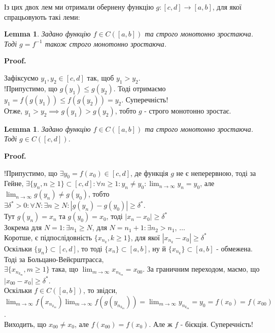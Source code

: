 \documentclass[a4paper, 14pt]{article}
\makeatletter
\def\qed{$\blacksquare$}
\theoremstyle{theoremdd}
\theoremstyle{theoremdd}
\theoremstyle{theoremdd}
\theoremstyle{theoremdd}
\theoremstyle{theoremdd}
\theoremstyle{theoremdd}
\theoremstyle{theoremdd}
\newtheorem{lemma}[theorem]{Lemma}
\theoremstyle{theoremdd}
\renewenvironment{proof}[1][Proof.\\]{\par
\pushQED{\hfill \qed}%
\normalfont \topsep6\p@\@plus6\p@\relax
\trivlist
\item\relax
{\bfseries
#1\@addpunct{.}}\hspace\labelsep\ignorespaces
}{%
\popQED\endtrivlist\@endpefalse
}
\makeatother
\begin{document}
Із цих двох лем ми отримали обернену функцію $g: [c,d] \to [a,b]$, для якої спрацьовують такі леми:

\begin{lemma}
Задано функцію $f \in C([a,b])$ та строго монотонно зростаюча. Тоді $g = f^{-1}$ також строго монотонно зростаюча.
\end{lemma}

\begin{proof}
Зафіксуємо $y_1,y_2 \in [c,d]$ так, щоб $y_1 > y_2$.\\
!Припустимо, що $g(y_1) \leq g(y_2)$. Тоді отримаємо $y_1 = f(g(y_1)) \leq f(g(y_2)) = y_2$. Суперечність!\\
Отже, $y_1 > y_2 \implies g(y_1) > g(y_2)$, тобто $g$ - строго монотонно зростає.
\end{proof}

\begin{lemma}
Задано функцію $f \in C([a,b])$ та строго монотонно зростаюча. Тоді $g \in C([c,d])$.
\end{lemma}

\begin{proof}
!Припустимо, що $\exists y_0 = f(x_0) \in [c,d]$, де функція $g$ не є неперервною, тоді за Гейне, $\exists \{y_n, n \geq 1\} \subset [c,d]: \forall n \geq 1: y_n \neq y_0: \displaystyle\lim_{n \to \infty} y_n = y_0$, але $\displaystyle\lim_{n \to \infty} g(y_n) \neq g(y_0)$, тобто\\
$\exists \delta^* > 0: \forall N: \exists n \geq N: |g(y_n)-g(y_0)| \geq \delta^*$.\\
Тут $g(y_n) = x_n$ та $g(y_0) = x_0$, тоді $|x_n-x_0| \geq \delta^*$\\
Зокрема для $N = 1: \exists n_1 \geq N$, для $N = n_1+1: \exists n_2 > n_1$, $\dots$\\
Коротше, є підпослідовність $\{x_{n_k}, k \geq 1\}$, для якої $|x_{n_k} -x_0| \geq \delta^*$\\
Оскільки $\{y_n\} \subset [c,d]$, то тоді $\{x_n \} \subset [a,b]$, ну й $\{x_{n_k}\} \subset [a,b]$ - обмежена. Тоді за Больцано-Вейєрштрасса, \\ $\exists \{x_{n_{k_m}}, m \geq 1\}$ така, що $\displaystyle\lim_{m \to \infty} x_{n_{k_m}} = x_{00}$. За граничним переходом, маємо, що $|x_{00}-x_0| \geq \delta^*$.\\
Оскільки $f \in C([a,b])$, то звідси, $\displaystyle\lim_{m \to \infty} f(x_{n_{k_m}}) \lim_{m \to \infty} f(g(y_{n_{k_m}})) = \lim_{m \to \infty} y_{n_{k_m}} = y_0 = f(x_0) = f(x_{00})$.\\
Виходить, що $x_{00} \neq x_0$, але $f(x_{00}) = f(x_0)$. Але ж $f$ - бієкція. Суперечність!
\end{proof}
\end{document}

